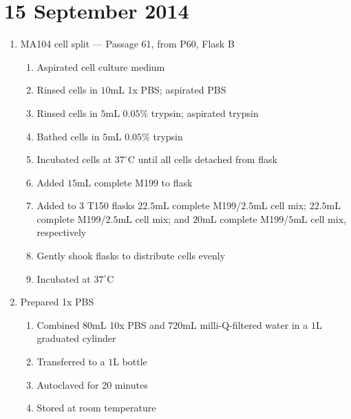 
\section*{15 September 2014}

\begin{enumerate}
	\item MA104 cell split --- Passage 61, from P60, Flask B
		\begin{enumerate}
			\item Aspirated cell culture medium
			\item Rinsed cells in $10$mL 1x PBS; aspirated PBS
			\item Rinsed cells in $5$mL $0.05$\% trypsin; aspirated trypsin
			\item Bathed cells in $5$mL $0.05$\% trypsin
			\item Incubated cells at $37^{\circ}$C until all cells detached from flask
			\item Added $15$mL complete M199 to flask
			\item Added to $3$ T150 flasks $22.5$mL complete M199/$2.5$mL cell mix; $22.5$mL complete M199/$2.5$mL cell mix; and $20$mL complete M199/$5$mL cell mix, respectively
			\item Gently shook flasks to distribute cells evenly
			\item Incubated at $37^{\circ}$C
		\end{enumerate}
		
	\item Prepared 1x PBS
		\begin{enumerate}
			\item Combined $80$mL 10x PBS and $720$mL milli-Q-filtered water in a $1$L graduated cylinder
			\item Transferred to a $1$L bottle
			\item Autoclaved for 20 minutes
			\item Stored at room temperature
		\end{enumerate}
		

\end{enumerate}
